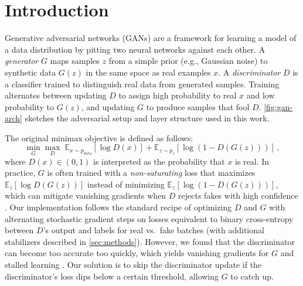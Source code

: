 \documentclass{article}
\theoremstyle{plain}
\theoremstyle{definition}
\theoremstyle{remark}
\begin{document}
\begin{abstract}
This work trains DCGAN-style generative adversarial networks on MNIST and Oxford Flowers~102, progressing from a compact architecture for $28\times 28$ digits to a deeper convolutional generator and discriminator for $64\times 64$ RGB flower images. The resulting flower generator is deployed in \underline{\href{https://neuralnector.issacroy.com}{NeuralNector}}, an interactive game in which human players act as the discriminator on grids of real versus synthetic images. Training is discussed in light of practical difficulties including discriminator dominance, vanishing gradients, and mode collapse, together with stabilizing modifications to the optimization procedure.
\end{abstract}

\section{Introduction}

Generative adversarial networks (GANs) \cite{GANs} are a framework for learning a model of a data distribution by pitting two neural networks against each other.
A \emph{generator} $G$ maps samples $z$ from a simple prior (e.g., Gaussian noise) to synthetic data $G(z)$ in the same space as real examples $x$.
A \emph{discriminator} $D$ is a classifier trained to distinguish real data from generated samples.
Training alternates between updating $D$ to assign high probability to real $x$ and low probability to $G(z)$, and updating $G$ to produce samples that fool $D$.
\cref{fig:gan-arch} sketches the adversarial setup and layer structure used in this work.

The original minimax objective \cite{GANs} is defined as follows:
\begin{equation}
\label{eq:gan-minimax}
\min_G \max_D \;
\mathbb{E}_{x \sim p_{\mathrm{data}}}[\log D(x)]
+ \mathbb{E}_{z \sim p_z}[\log (1 - D(G(z)))]\,,
\end{equation}
where $D(x) \in (0,1)$ is interpreted as the probability that $x$ is real.
In practice, $G$ is often trained with a \emph{non-saturating} loss that maximizes $\mathbb{E}_z[\log D(G(z))]$ instead of minimizing $\mathbb{E}_z[\log(1-D(G(z)))]$, which can mitigate vanishing gradients when $D$ rejects fakes with high confidence \cite{GANs}.
Our implementation follows the standard recipe of optimizing $D$ and $G$ with alternating stochastic gradient steps on losses equivalent to binary cross-entropy between $D$'s output and labels for real vs.\ fake batches (with additional stabilizers described in \cref{sec:methods}). However, we found that the discriminator can become too accurate too quickly, which yields vanishing gradients for $G$ and stalled learning \cite{TrainingGANs,ImprovedGANs}. Our solution is to skip the discriminator update if the discriminator's loss dips below a certain threshold, allowing $G$ to catch up.
\end{document}
